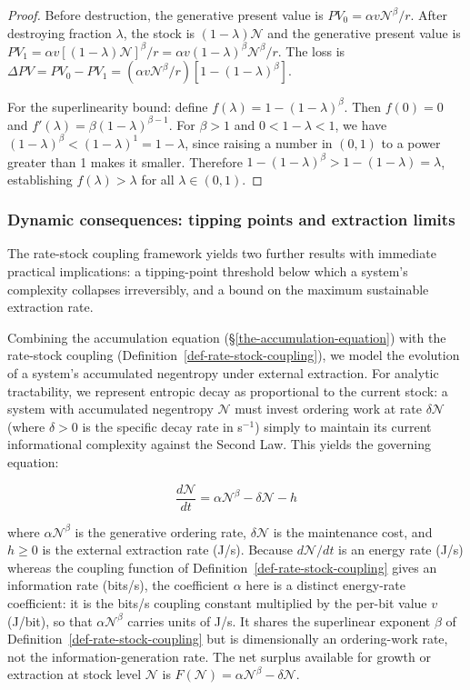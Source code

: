 \documentclass[11pt]{article}
\theoremstyle{plain}
\theoremstyle{definition}
\theoremstyle{remark}
\let\origsubsubsection\subsubsection
\renewcommand{\subsubsection}{\needspace{4\baselineskip}\origsubsubsection}
\begin{document}
\begin{proof}
Before destruction, the generative present value is $PV_0 = \alpha v \mathcal{N}^\beta / r$. After destroying fraction $\lambda$, the stock is $(1-\lambda)\mathcal{N}$ and the generative present value is $PV_1 = \alpha v [(1-\lambda)\mathcal{N}]^\beta / r = \alpha v (1-\lambda)^\beta \mathcal{N}^\beta / r$. The loss is $\Delta PV = PV_0 - PV_1 = (\alpha v \mathcal{N}^\beta / r)[1 - (1-\lambda)^\beta]$.

For the superlinearity bound: define $f(\lambda) = 1 - (1-\lambda)^\beta$. Then $f(0) = 0$ and $f'(\lambda) = \beta(1-\lambda)^{\beta-1}$. For $\beta > 1$ and $0 < 1-\lambda < 1$, we have $(1-\lambda)^\beta < (1-\lambda)^1 = 1-\lambda$, since raising a number in $(0,1)$ to a power greater than 1 makes it smaller. Therefore $1-(1-\lambda)^\beta > 1-(1-\lambda) = \lambda$, establishing $f(\lambda) > \lambda$ for all $\lambda \in (0,1)$.
\end{proof}

\subsubsection{Dynamic consequences: tipping points and extraction
limits}\label{dynamic-consequences-tipping-points-and-extraction-limits}

The rate-stock coupling framework yields two further results with
immediate practical implications: a tipping-point threshold below which
a system's complexity collapses irreversibly, and a bound on the maximum
sustainable extraction rate.

Combining the accumulation equation (§\ref{the-accumulation-equation})
with the rate-stock coupling (Definition~\ref{def-rate-stock-coupling}),
we model the evolution of a system's accumulated negentropy under
external extraction. For analytic tractability, we represent entropic
decay as proportional to the current stock: a system with accumulated
negentropy \(\mathcal{N}\) must invest ordering work at rate
\(\delta\mathcal{N}\) (where \(\delta > 0\) is the specific decay rate
in s\(^{-1}\)) simply to maintain its current informational complexity
against the Second Law. This yields the governing equation:

\[\frac{d\mathcal{N}}{dt} = \alpha\mathcal{N}^\beta - \delta\mathcal{N} - h\]

where \(\alpha\mathcal{N}^\beta\) is the generative ordering rate,
\(\delta\mathcal{N}\) is the maintenance cost, and \(h \geq 0\) is the
external extraction rate (J/s). Because \(d\mathcal{N}/dt\) is an energy
rate (J/s) whereas the coupling function of
Definition~\ref{def-rate-stock-coupling} gives an information rate
(bits/s), the coefficient \(\alpha\) here is a distinct energy-rate
coefficient: it is the bits/s coupling constant multiplied by the
per-bit value \(v\) (J/bit), so that \(\alpha\mathcal{N}^\beta\) carries
units of J/s. It shares the superlinear exponent \(\beta\) of
Definition~\ref{def-rate-stock-coupling} but is dimensionally an
ordering-work rate, not the information-generation rate. The net surplus
available for growth or extraction at stock level \(\mathcal{N}\) is
\(F(\mathcal{N}) = \alpha\mathcal{N}^\beta - \delta\mathcal{N}\).
\end{document}
